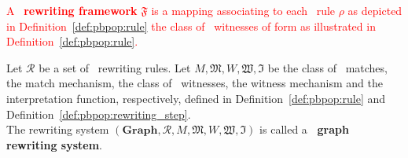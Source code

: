 \documentclass{book}
\begin{document}
    \textcolor{red}{
    \begin{definition}
      A \pbpop~\textbf{rewriting framework} $\mathfrak{F}$ is a mapping associating to each \pbpop~rule $\rho$ as depicted in Definition~\ref{def:pbpop:rule} 
       the class of \pbpop~witnesses of form as illustrated in Definition~\ref{def:pbpop:rule}.
    \end{definition}
    }

    
    \begin{definition}
      Let $\mathcal{R}$ be a set of \pbpop~rewriting rules.
      Let $M, \mathfrak{M}, W, \mathfrak{W}, \mathfrak{I}$ be the class of \pbpop~matches, the match mechanism, the class of \pbpop~witnesses, the witness mechanism and the interpretation function, respectively, defined in Definition~\ref{def:pbpop:rule} and Definition~\ref{def:pbpop:rewriting_step}.
      \\
      The rewriting system $(\mathbf{Graph}, \mathcal{R}, M, \mathfrak{M}, W, \mathfrak{W}, \mathfrak{I})$ is called a \textbf{\pbpop~graph rewriting system}.
    \end{definition}
\end{document}
